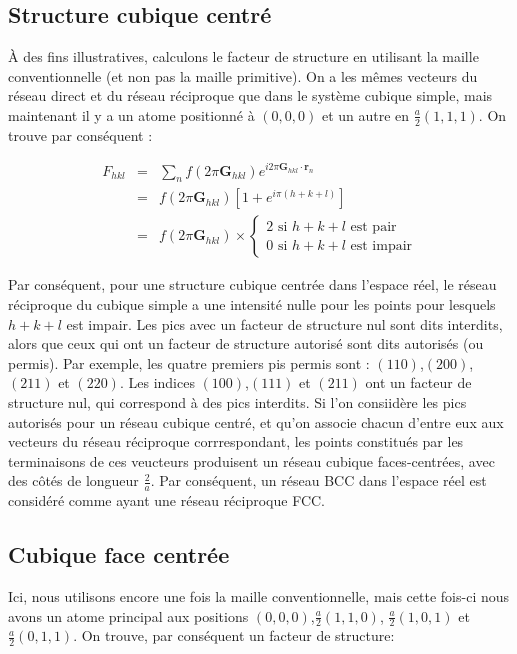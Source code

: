 \subsection{Structure cubique centré}

À des fins illustratives, calculons le facteur de structure en utilisant la
maille conventionnelle (et non pas la maille primitive). On a les mêmes vecteurs
du réseau direct et du réseau réciproque que dans le système cubique simple, mais
maintenant il y a un atome positionné à $(0,0,0)$ et un autre en
$\frac{a}{2}(1,1,1)$. On trouve par conséquent :

\begin{eqnarray}
    F_{hkl} & = & \sum_n f(2\pi\mathbf{G}_{hkl}) e^{i 2\pi \mathbf{G}_{hkl}\cdot\mathbf{r}_n} \\
    & = & f(2\pi \mathbf{G}_{hkl}) [1 + e^{i\pi(h+k+l)}] \\
    & = & f(2\pi \mathbf{G}_{hkl}) \times \begin{cases} 2 \text{ si } h+k+l \text{ est pair}\\ 0 \text{ si } h+k+l \text{ est impair}\end{cases}
\end{eqnarray}

Par conséquent, pour une structure cubique centrée dans l'espace réel, le réseau 
réciproque du cubique simple a une intensité nulle pour les points pour lesquels
$h + k + l$ est impair. Les pics avec un facteur de structure nul sont dits
interdits, alors que ceux qui ont un facteur de structure autorisé sont dits
autorisés (ou permis). Par exemple, les quatre premiers pis permis sont :
$(110)$,$(200)$,$(211)$ et $(220)$. Les indices $(100)$,$(111)$ et $(211)$ ont un
facteur de structure nul, qui correspond à des pics interdits. Si l'on consiidère
les pics autorisés pour un réseau cubique centré, et qu'on associe chacun d'entre
eux aux vecteurs du réseau réciproque corrrespondant, les points constitués par
les terminaisons de ces veucteurs produisent un réseau cubique faces-centrées,
avec des côtés de longueur $\frac{2}{a}$. Par conséquent, un réseau BCC dans
l'espace réel est considéré comme ayant une réseau réciproque FCC. 

\subsection{Cubique face centrée}

Ici, nous utilisons encore une fois la maille conventionnelle, mais cette fois-ci
nous avons un atome principal aux positions $(0,0,0)$,$\frac{a}{2}(1,1,0)$,
$\frac{a}{2}(1,0,1)$ et $\frac{a}{2}(0,1,1)$. On trouve, par conséquent un
facteur de structure:

